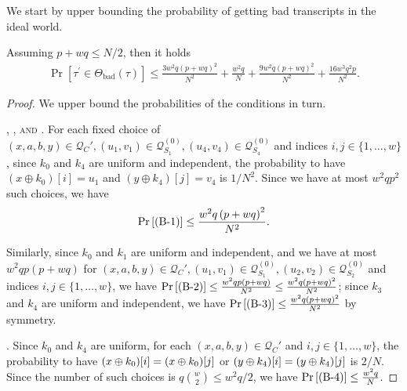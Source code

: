 We start by upper bounding the probability of getting bad transcripts in the ideal world.

\begin{lemma}
	\label{lemma:bad-tau-4-rounds}
	
	Assuming $p+wq\leq N/2$, then it holds
	\begin{align}
	\operatorname{Pr}[\tau^{\prime} \in \Theta_{\mathrm{bad}}(\tau)] \leq \frac{3w^{2} q \left(p+w q\right)^{2}}{N^{2}} + \frac{w^{2} q}{N} + \frac{9w^2 q (p+w q)^{2}}{N^2}+ \frac{16w^3q^2p}{N^2}.
	\label{eq:bound-bad-tau-4-rounds}
	\end{align}
\end{lemma}
\begin{proof}
We upper bound the probabilities of the conditions in turn.



\smallskip
\noindent \textsc{\bone, \btwo, and \bthree}.
For each fixed choice of $(x,a,b, y) \in \mathcal{Q}_{C}', \left(u_{1}, v_{1}\right) \in \mathcal{Q}_{S_{1}}^{(0)}, \left(u_{4}, v_{4}\right) \in \mathcal{Q}_{S_{4}}^{(0)}$ and indices $i, j \in \{1, \ldots, w\}$, since $k_{0}$ and $k_{4}$ are uniform and independent, the probability to have $(x \oplus k_{0})[i]=u_1$ and $(y \oplus k_{4})[j]=v_4$ is $1/N^2$. Since we have at most $w^{2}qp^2$ such choices, we have
%
$$
\operatorname{Pr}\left[\text{(B-1)}\right] \leq \frac{w^{2} q \left(p+w q\right)^{2}}{N^{2}}.
$$
%

Similarly, since $k_{0}$ and $k_{1}$ are uniform and independent, and we have at most $w^{2} q p \left(p+w q\right)$ for $(x,a,b, y) \in \mathcal{Q}_{C}', \left(u_{1}, v_{1}\right) \in \mathcal{Q}_{S_{1}}^{(0)}, \left(u_{2}, v_{2}\right) \in \mathcal{Q}_{S_{2}}^{(0)}$ and indices $i, j \in \{1, \ldots, w\}$, we have $\operatorname{Pr}\left[\text{(B-2)}\right] \leq \frac{w^{2} q p \left(p+w q\right)}{N^{2}}\leq\frac{w^{2} q \left(p+w q\right)^{2}}{N^{2}}$; since $k_3$ and $k_4$ are uniform and independent, we have $\operatorname{Pr}\left[\text{(B-3)}\right] \leq \frac{w^{2} q \left(p+w q\right)^{2}}{N^{2}}$ by symmetry.



\smallskip
\noindent \textsc{\bfour}.
Since $k_{0}$ and $k_{4}$ are uniform, for each $(x,a,b, y) \in \mathcal{Q}_{C}'$ and $i, j \in \{1, \ldots, w\}$, the probability to have $(x\oplus k_0)[i]=(x\oplus k_0)[j]$ or $(y\oplus k_4)[i]=(y\oplus k_4)[j]$ is $2/N$. Since the number of such choices is $q{w\choose 2}\leq w^2q/2$, we have $\operatorname{Pr}\left[\text{(B-4)}\right] \leq \frac{w^{2} q}{N}$.






\end{proof}
